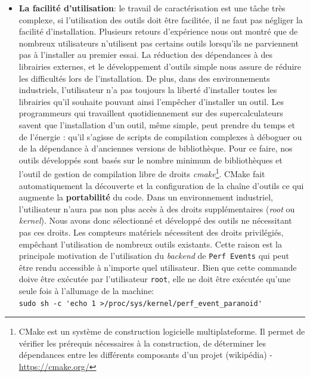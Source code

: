 \begin{itemize}
        \item \textbf{La facilité d'utilisation}: le travail de caractérisation est une tâche très complexe, si l'utilisation des outils doit être facilitée, il ne faut pas négliger la facilité d'installation. Plusieurs retours d'expérience nous ont montré que de nombreux utilisateurs n'utilisent pas certains outils lorsqu'ils ne parviennent pas à l'installer au premier essai. La réduction des dépendances à des librairies externes, et le développement d'outils simple nous assure de réduire les difficultés lors de l'installation. De plus, dans des environnements industriels, l'utilisateur n'a pas toujours la liberté d'installer toutes les librairies qu'il souhaite pouvant ainsi l'empêcher d'installer un outil. Les programmeurs qui travaillent quotidiennement sur des supercalculateurs savent que l'installation d'un outil, même simple, peut prendre du temps et de l'énergie : qu'il s'agisse de scripts de compilation complexes à déboguer ou de la dépendance à d’anciennes versions de bibliothèque. Pour ce faire, nos outils développés sont basés sur le nombre minimum de bibliothèques et l'outil de gestion de compilation libre de droits \textit{cmake}\footnote{CMake est un système de construction logicielle multiplateforme. Il permet de vérifier les prérequis nécessaires à la construction, de déterminer les dépendances entre les différents composants d'un projet (wikipédia) - \url{https://cmake.org/}}. CMake fait automatiquement la découverte et la configuration de la chaîne d'outils ce qui augmente la \textbf{portabilité} du code.
        Dans un environnement industriel, l'utilisateur n'aura pas non plus accès à des droits supplémentaires (\textit{root} ou \textit{kernel}). Nous avons donc sélectionné et développé des outils ne nécessitant pas ces droits. Les compteurs matériels nécessitent des droits privilégiés, empêchant l'utilisation de nombreux outils existants. Cette raison est la principale motivation de l'utilisation du \textit{backend} de \verb=Perf Events= qui peut être rendu accessible à n'importe quel utilisateur. Bien que cette commande doive être exécutée par l'utilisateur \verb=root=, elle ne doit être exécutée qu'une seule fois à l'allumage de la machine:\\
        \verb|sudo sh -c 'echo 1 >/proc/sys/kernel/perf_event_paranoid'|\\
    
    \end{itemize}

        
        
